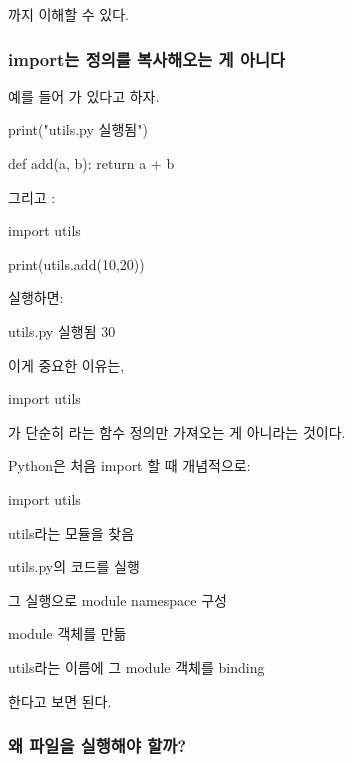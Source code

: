 까지 이해할 수 있다.

\subsubsection{import는 정의를 복사해오는 게 아니다}

예를 들어 가 있다고 하자.

\begin{dhkcode}
print("utils.py 실행됨")

def add(a, b):
    return a + b
\end{dhkcode}

그리고 :

\begin{dhkcode}
import utils

print(utils.add(10,20))
\end{dhkcode}

실행하면:

\begin{dhkzsh}
utils.py 실행됨
30
\end{dhkzsh}

이게 중요한 이유는,

\begin{dhkcode}
import utils
\end{dhkcode}

가 단순히 라는 함수 정의만 가져오는 게 아니라는 것이다.

Python은 처음 import 할 때 개념적으로:

\begin{dhksmry}[centered]
import utils

\da

utils라는 모듈을 찾음

\da

utils.py의 코드를 실행

\da

그 실행으로 module namespace 구성

\da

module 객체를 만듦

\da

utils라는 이름에 그 module 객체를 binding
\end{dhksmry}

한다고 보면 된다.

\subsubsection{왜 파일을 실행해야 할까?}

